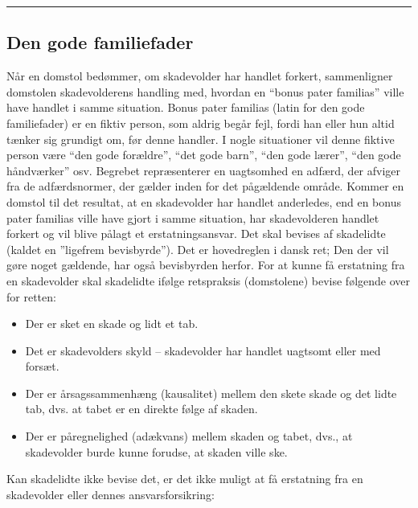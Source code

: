 \documentclass[]{book}
\providecommand{\tightlist}{%
  \setlength{\itemsep}{0pt}\setlength{\parskip}{0pt}}
\begin{document}
\begin{center}\rule{0.5\linewidth}{\linethickness}\end{center}

\hypertarget{den-gode-familiefader}{%
\subsection{Den gode familiefader}\label{den-gode-familiefader}}

Når en domstol bedømmer, om skadevolder har handlet forkert, sammenligner domstolen skadevolderens handling med, hvordan en ``bonus pater familias'' ville have handlet i samme situation.
Bonus pater familias (latin for den gode familiefader) er en fiktiv person, som aldrig begår fejl, fordi han eller hun altid tænker sig grundigt om, før denne handler. I nogle situationer vil denne fiktive person være ``den gode forældre'', ``det gode barn'', ``den gode lærer'', ``den gode håndværker'' osv. Begrebet repræsenterer en uagtsomhed en adfærd, der afviger fra de adfærdsnormer, der gælder inden for det pågældende område.
Kommer en domstol til det resultat, at en skadevolder har handlet anderledes, end en bonus pater familias ville have gjort i samme situation, har skadevolderen handlet forkert og vil blive pålagt et erstatningsansvar.
Det skal bevises af skadelidte (kaldet en ''ligefrem bevisbyrde''). Det er hovedreglen i dansk ret; Den der vil gøre noget gældende, har også bevisbyrden herfor.
For at kunne få erstatning fra en skadevolder skal skadelidte ifølge retspraksis (domstolene) bevise følgende over for retten:

\begin{itemize}
\tightlist
\item
  Der er sket en skade og lidt et tab.\\
\item
  Det er skadevolders skyld -- skadevolder har handlet uagtsomt eller med forsæt.\\
\item
  Der er årsagssammenhæng (kausalitet) mellem den skete skade og det lidte tab, dvs. at tabet er en direkte følge af skaden.\\
\item
  Der er påregnelighed (adækvans) mellem skaden og tabet, dvs., at skadevolder burde kunne forudse, at skaden ville ske.
\end{itemize}

Kan skadelidte ikke bevise det, er det ikke muligt at få erstatning fra en skadevolder eller dennes ansvarsforsikring:
\end{document}

